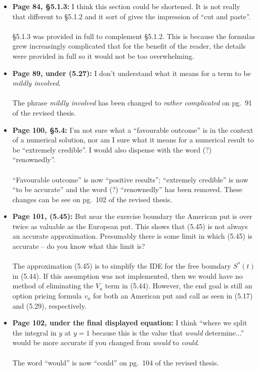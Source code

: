 \documentclass{article}
\begin{document}
\begin{enumerate}
\begin{itemize}
			\item{\textbf{Page 84, \S5.1.3:} I think this section could be shortened. It is not really that different to \S5.1.2 and it sort of gives the impression of ``cut and paste''.
			\\\\}
			\S5.1.3 was provided in full to complement \S5.1.2. This is because the formulas grew increasingly complicated that for the benefit of the reader, the details were provided in full so it would not be too overwhelming.
			
			\item{\textbf{Page 89, under (5.27):} I don't understand what it means for a term to be \emph{mildly involved}.
			\\\\}
			The phrase \emph{mildly involved} has been changed to \emph{rather complicated} on pg.~91 of the revised thesis.
			\item{\textbf{Page 100, \S5.4: } I'm not sure what a ``favourable outcome'' is in the context of a numerical solution, nor am I sure what it means for a numerical result to be ``extremely credible''. I would also dispense with the word (?) ``renownedly''.
			\\\\}
			``Favourable outcome'' is now ``positive results''; ``extremely credible'' is now ``to be accurate'' and the word (?) ``renownedly'' has been removed. These changes can be see on pg.~102 of the revised thesis.
			
			\item{\textbf{Page 101, (5.45): } But near the exercise boundary the American put is over twice as valuable as the European put. This shows that (5.45) is not always an accurate approximation. Presumably there is some limit in which (5.45) is accurate -- do you know what this limit is?
			\\\\}
			The approximation (5.45) is to simplify the IDE for the free boundary $S^*(t)$ in (5.44). If this assumption was not implemented, then we would have no method of eliminating the $V_a$ term in (5.44). However, the end goal is still an option pricing formula $v_a$ for both an American put and call as seen in (5.17) and (5.29), respectively.
			
			\item{\textbf{Page 102, under the final displayed equation: } I think ``where we split the integral in $y$ at $y=1$ because this is the value that \emph{would} determine...'' would be more accurate if you changed from \emph{would} to \emph{could}.
			\\\\}
			The word ``would'' is now ``could'' on pg.~104 of the revised thesis.
			

\end{itemize}
\end{enumerate}
\end{document}
